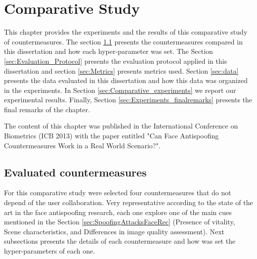 \chapter{Comparative Study}
\label{chap:Comparative_Study}

This chapter provides the experiments and the results of this comparative study of countermeasures. The section \ref{sec:Evaluated_countermeasures} presents the countermeasures compared in this dissertation and how each hyper-parameter was set. The Section \ref{sec:Evaluation_Protocol} presents the evaluation protocol applied in this dissertation and section \ref{sec:Metrics} presents metrics used. Section \ref{sec:data} presents the data evaluated in this dissertation and how this data was organized in the experiments. In Section \ref{sec:Comparative_experiments} we report our experimental results. Finally, Section \ref{sec:Experiments_finalremarks} presents the final remarks of the chapter.

The content of this chapter was published in the International Conference on Biometrics (ICB 2013) with the paper entitled "Can Face Antispoofing Countermeasures Work in a Real World Scenario?".




\section{Evaluated countermeasures}
\label{sec:Evaluated_countermeasures}

For this comparative study were selected four countermeasures that do not depend of the user collaboration. Very representative according to the state of the art in the face antispoofing research, each one explore one of the main cues mentioned in the Section \ref{sec:SpoofingAttacksFaceRec} (Presence of vitality, Scene characteristics, and Differences in image quality assessment). Next subsections presents the details of each countermeasure and how was set the hyper-parameters of each one.

